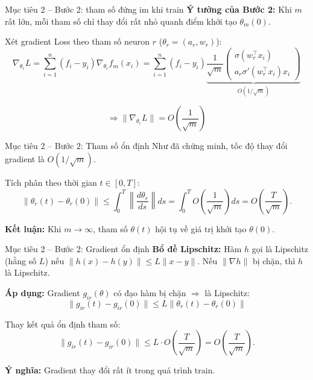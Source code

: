 \begin{frame}{Mục tiêu 2 – Bước 2: tham số đứng im khi train}
  \textbf{Ý tưởng của Bước 2:}  
  Khi $m$ rất lớn, mỗi tham số chỉ thay đổi rất nhỏ quanh điểm khởi tạo $\theta_m(0)$.

 \vspace{0.3cm}
  
  Xét gradient Loss theo tham số neuron $r$ ($\theta_r = (a_r, w_r)$):
  \[
    \nabla_{\theta_r} L 
    = \sum_{i=1}^n (f_i - y_i) \nabla_{\theta_r} f_m(x_i)
    = \sum_{i=1}^n (f_i - y_i) \underbrace{\frac{1}{\sqrt{m}} \begin{pmatrix} \sigma(w_r^\top x_i) \\ a_r \sigma'(w_r^\top x_i) x_i \end{pmatrix}}_{O(1/\sqrt{m})}
  \]
  
  \[
    \Rightarrow \|\nabla_{\theta_r} L\| = O\left(\frac{1}{\sqrt{m}}\right)
  \]


\end{frame}

\begin{frame}{Mục tiêu 2 – Bước 2: Tham số ổn định}
  Như đã chứng minh, tốc độ thay đổi gradient là $O(1/\sqrt{m})$.
  
  Tích phân theo thời gian $t \in [0,T]$:
  \[
    \|\theta_r(t) - \theta_r(0)\| 
    \le \int_0^T \left\| \frac{d\theta_r}{ds} \right\| ds 
    = \int_0^T O\left(\frac{1}{\sqrt{m}}\right) ds
    = O\left(\frac{T}{\sqrt{m}}\right).
  \]

  \textbf{Kết luận:} Khi $m \to \infty$, tham số $\theta(t)$ hội tụ về giá trị khởi tạo $\theta(0)$.
\end{frame}

\begin{frame}{Mục tiêu 2 – Bước 2: Gradient ổn định}
  \textbf{Bổ đề Lipschitz:}
  Hàm $h$ gọi là Lipschitz (hằng số $L$) nếu $\|h(x)-h(y)\| \le L\|x-y\|$.
  Nếu $\|\nabla h\|$ bị chặn, thì $h$ là Lipschitz.

  \vspace{0.2cm}
  \textbf{Áp dụng:} Gradient $g_{ir}(\theta)$ có đạo hàm bị chặn $\Rightarrow$ là Lipschitz:
  \[
    \|g_{ir}(t) - g_{ir}(0)\| \le L \|\theta_r(t) - \theta_r(0)\|
  \]
  
  Thay kết quả ổn định tham số:
  \[
    \|g_{ir}(t) - g_{ir}(0)\| \le L \cdot O\left(\frac{T}{\sqrt{m}}\right) = O\left(\frac{T}{\sqrt{m}}\right).
  \]

  \textbf{Ý nghĩa:} Gradient thay đổi rất ít trong quá trình train.
\end{frame}

